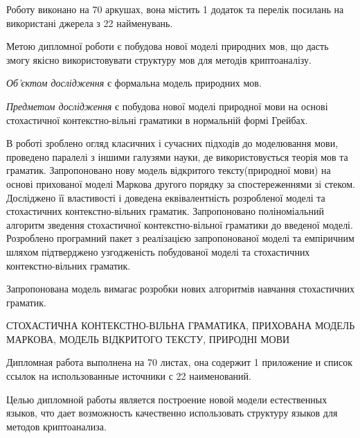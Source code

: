 \abstractUkr

Роботу виконано на 70 аркушах, вона містить 1 додаток та перелік посилань на використані джерела з 22 найменувань.

Метою дипломної роботи є побудова нової моделі природних мов, що дасть змогу якісно
використовувати структуру мов для методів криптоаналізу.

\emph{Об'єктом дослідження} є формальна модель природних мов.

\emph{Предметом дослідження} є побудова нової моделі природної мови на основі стохастичної контекстно-вільні граматики в нормальній формі Грейбах.

В роботі зроблено огляд класичних і сучасних підходів до моделювання мови, проведено паралелі з іншими галузями науки, де використовується теорія мов та граматик. Запропоновано нову модель відкритого тексту(природної мови) на основі прихованої моделі Маркова другого порядку за спостереженнями зі стеком. Досліджено її властивості і доведена еквівалентність розробленої моделі та стохастичних контекстно-вільних граматик. Запропоновано поліноміальний алгоритм зведення стохастичної контекстно-вільної граматики до введеної моделі. Розроблено програмний пакет з реалізацією запропонованої моделі та емпіричним шляхом підтверджено узгодженість побудованої моделі та стохастичних контекстно-вільних граматик.

Запропонована модель вимагає розробки нових алгоритмів навчання стохастичних граматик.

\MakeUppercase{стохастична контекстно-вільна граматика, прихована модель Маркова, модель відкритого тексту, природні мови}

\abstractRus

Дипломная работа выполнена на 70 листах, она содержит 1 приложение и список ссылок на использованные источники с 22 наименований.

Целью дипломной работы является построение новой модели естественных языков, что дает возможность качественно использовать структуру языков для методов криптоанализа.

